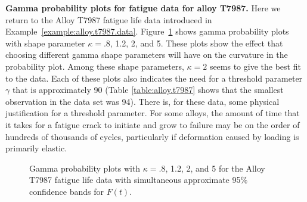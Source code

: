 \begin{example}
\label{example:gamma.probplot.alloy.t7987}
{\bf Gamma probability plots for fatigue data for alloy T7987.}
Here we return to the Alloy T7987 fatigue life data introduced in
Example~\ref{example:alloy.t7987.data}.
Figure~\ref{figure:alloy.t7987.npp.gamma.all.ps}
shows gamma probability plots with shape parameter
$\kappa=.8$, 1.2, 2, and 5. These plots show the effect
that choosing different gamma shape parameters will have on the
curvature in the probability plot. Among these shape parameters,
$\kappa=2$ seems to give the best fit to the data.  Each of these
plots also indicates the need for a threshold parameter $\gamma$ that is
approximately 90 (Table \ref{table:alloy.t7987} shows that the
smallest observation in the data set was 94). There is, for these
data, some physical justification for a threshold parameter. For some
alloys, the amount of time that it takes for a fatigue crack to
initiate and grow to failure may be on the order of hundreds of
thousands of cycles, particularly if deformation caused by loading is
primarily elastic.
\begin{figure}
\caption{Gamma probability plots with $\kappa=.8$, 1.2, 2, and 5
for the Alloy T7987 fatigue life data with
simultaneous approximate 95\% confidence bands for $F(t)$.}
\label{figure:alloy.t7987.npp.gamma.all.ps}
\end{figure}
\end{example}


